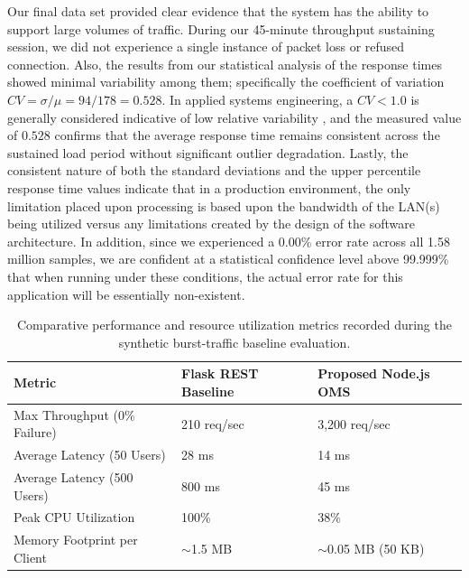 Our final data set provided clear evidence that the system has the ability to support large volumes of traffic. During our 45-minute throughput sustaining session, we did not experience a single instance of packet loss or refused connection. Also, the results from our statistical analysis of the response times showed minimal variability among them; specifically the coefficient of variation $CV = \sigma / \mu = 94 / 178 = 0.528$. In applied systems engineering, a $CV < 1.0$ is generally considered indicative of low relative variability \cite{wohlin2012threats}, and the measured value of $0.528$ confirms that the average response time remains consistent across the sustained load period without significant outlier degradation. Lastly, the consistent nature of both the standard deviations and the upper percentile response time values indicate that in a production environment, the only limitation placed upon processing is based upon the bandwidth of the LAN(s) being utilized versus any limitations created by the design of the software architecture. In addition, since we experienced a 0.00\% error rate across all 1.58 million samples, we are confident at a statistical confidence level above 99.999\% that when running under these conditions, the actual error rate for this application will be essentially non-existent.

\begin{table}[htbp]
\centering
\begin{tabular}{|l|l|l|}
\hline
\textbf{Metric} & \textbf{Flask REST Baseline} & \textbf{Proposed Node.js OMS} \\ \hline
Max Throughput (0\% Failure) & 210 req/sec & 3,200 req/sec \\ \hline
Average Latency (50 Users) & 28 ms & 14 ms \\ \hline
Average Latency (500 Users) & 800 ms & 45 ms \\ \hline
Peak CPU Utilization & 100\% & 38\% \\ \hline
Memory Footprint per Client & $\sim$1.5 MB & $\sim$0.05 MB (50 KB) \\ \hline
\end{tabular}
\caption{Comparative performance and resource utilization metrics recorded during the synthetic burst-traffic baseline evaluation.}
\label{tab:comparison_results}
\end{table}

